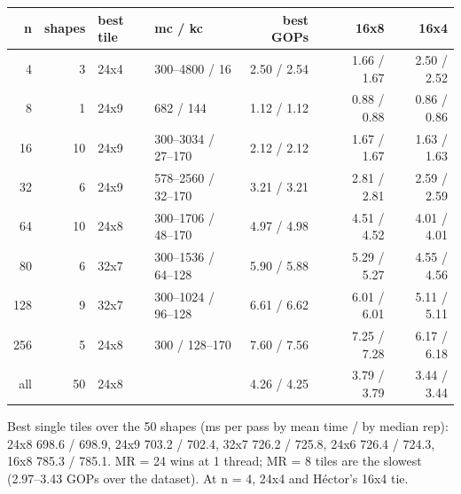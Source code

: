 \begin{center}\small
\begin{tabular}{@{}rrll rr rr@{}}
\toprule
n & shapes & best tile & mc / kc & best GOPs & & 16x8 & 16x4 \\
\midrule
4 & 3 & 24x4 & 300--4800 / 16 & 2.50 / 2.54 &  & 1.66 / 1.67 & 2.50 / 2.52 \\
8 & 1 & 24x9 & 682 / 144 & 1.12 / 1.12 &  & 0.88 / 0.88 & 0.86 / 0.86 \\
16 & 10 & 24x9 & 300--3034 / 27--170 & 2.12 / 2.12 &  & 1.67 / 1.67 & 1.63 / 1.63 \\
32 & 6 & 24x9 & 578--2560 / 32--170 & 3.21 / 3.21 &  & 2.81 / 2.81 & 2.59 / 2.59 \\
64 & 10 & 24x8 & 300--1706 / 48--170 & 4.97 / 4.98 &  & 4.51 / 4.52 & 4.01 / 4.01 \\
80 & 6 & 32x7 & 300--1536 / 64--128 & 5.90 / 5.88 &  & 5.29 / 5.27 & 4.55 / 4.56 \\
128 & 9 & 32x7 & 300--1024 / 96--128 & 6.61 / 6.62 &  & 6.01 / 6.01 & 5.11 / 5.11 \\
256 & 5 & 24x8 & 300 / 128--170 & 7.60 / 7.56 &  & 7.25 / 7.28 & 6.17 / 6.18 \\
\midrule
all & 50 & 24x8 &  & 4.26 / 4.25 &  & 3.79 / 3.79 & 3.44 / 3.44 \\
\bottomrule
\end{tabular}
\end{center}

\noindent Best single tiles over the 50 shapes (ms per pass by mean time / by median rep): 24x8 698.6 / 698.9, 24x9 703.2 / 702.4, 32x7 726.2 / 725.8, 24x6 726.4 / 724.3, 16x8 785.3 / 785.1. MR = 24 wins at 1 thread; MR = 8 tiles are the slowest (2.97--3.43 GOPs over the dataset). At n = 4, 24x4 and H\'ector's 16x4 tie.

